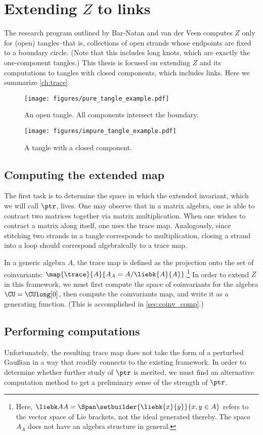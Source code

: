 \section{Extending $Z$ to links}
The research program outlined by Bar-Natan and van der Veen computes $Z$
only for (open) tangles--that is, collections of open strands whose endpoints
are fixed to a boundary circle. (Note that this includes long knots, which are
exactly the one-component tangles.) This thesis is focused on extending $Z$ and
its computations to tangles with closed components, which includes links. Here
we summarize \cref{ch:trace}.
\begin{figure}[h]
        \centering
        \texttt{[image: figures/pure\_tangle\_example.pdf]}
        \caption{An open tangle. All components intersect the boundary.}
        \label{fig:open_tangle}
\end{figure}
\begin{figure}[h]
        \centering
        \texttt{[image: figures/impure\_tangle\_example.pdf]}
        \caption{A tangle with a closed component.}
        \label{fig:impure_tangle}
\end{figure}

\subsection{Computing the extended map}
The first task is to determine the space in which the extended invariant, which
we will call $\ptr$, lives. One may observe that in a matrix algebra, one is
able to contract two matrices together via matrix multiplication. When one
wishes to contract a matrix along itself, one uses the trace map. Analogously,
since stitching two strands in a tangle corresponds to multiplication, closing a
strand into a loop should correspond algebraically to a trace map.

In a generic algebra $A$, the trace map is defined as the projection onto the
set of coinvariants: $\map {\trace} {A} {A_A = A/\liebk{A}{A}}$.\footnote{Here,
$\liebk AA = \Span\setbuilder{\liebk{x}{y}}{x, y\in A}$ refers to the vector
space of Lie brackets, not the ideal generated thereby. The space $A_A$ does not
have an algebra structure in general.} In order to extend $Z$ in this framework,
we must first compute the space of coinvariants for the algebra $\CU =
\CUlong[0]$, then compute the coinvariants map, and write it as a generating
function. (This is accomplished in \cref{sec:coinv_comp}.)

\subsection{Performing computations}
Unfortunately, the resulting trace map does not take the form of a perturbed
Gaußian in a way that readily connects to the existing framework. In order to
determine whether further study of $\ptr$ is merited, we must find an
alternative computation method to get a preliminary sense of the strength of
$\ptr$.

